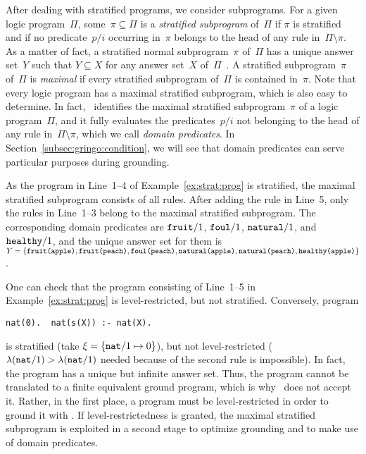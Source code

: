 After dealing with stratified programs, we consider subprograms.
For a given logic program~$\Pi$, some~$\pi\subseteq\Pi$ is a 
\emph{stratified subprogram} of~$\Pi$ if
$\pi$ is stratified and if
no predicate~$p/i$ occurring in~$\pi$ belongs to the head of any rule in~$\Pi\setminus\pi$.
As a matter of fact,
a stratified normal subprogram~$\pi$ of~$\Pi$ has a unique answer set~$Y$ such that
$Y\subseteq X$ for any answer set~$X$ of~$\Pi$~\cite{liftur94a}.
A stratified subprogram~$\pi$ of~$\Pi$ is \emph{maximal} if every stratified
subprogram of~$\Pi$ is contained in~$\pi$.
Note that every logic program has a maximal stratified subprogram,
which is also easy to determine.
In fact, \gringo\ identifies the maximal stratified subprogram~$\pi$
of a logic program~$\Pi$,
and it fully evaluates the predicates~$p/i$ not belonging to the head of any rule in~$\Pi\setminus\pi$,
which we call \emph{domain predicates}.
In Section~\ref{subsec:gringo:condition},
we will see that domain predicates can serve particular purposes during grounding.

\begin{example}\label{ex:strat:max}
As the program in Line~1--4 of Example~\ref{ex:strat:prog} is stratified,
the maximal stratified subprogram consists of all rules.
After adding the rule in Line~5,
only the rules in Line~1--3 belong to the maximal stratified subprogram.
The corresponding domain predicates are
$\texttt{fruit}/1$,
$\texttt{foul}/1$,
$\texttt{natural}/1$, and
$\texttt{healthy}/1$, 
and the unique answer set for them is
$
Y
=
\{
\code{\pred{fruit}(\const{apple})},\linebreak[1]
\code{\pred{fruit}(\const{peach})},\linebreak[1]
\code{\pred{foul}(\const{peach})},\linebreak[1]
\code{\pred{natural}(\const{apple})},\linebreak[1]
\code{\pred{natural}(\const{peach})},\linebreak[1]
\code{\pred{healthy}(\const{apple})}
\}
$.
\eexample
\end{example}

One can check that the program consisting of Line~1--5
in Example~\ref{ex:strat:prog} is level-restricted, but not stratified.
Conversely, program
\begin{lstlisting}[numbers=none]
nat(0).  nat(s(X)) :- nat(X).
\end{lstlisting}
is stratified (take $\xi=\{\texttt{nat}/1 \mapsto 0\}$),
but not level-restricted
($\lambda(\texttt{nat}/1)>\lambda(\texttt{nat}/1)$
 needed because of the second rule is impossible).
In fact, the program has a unique but infinite answer set.
Thus,
the program cannot be translated to a finite equivalent ground program,
which is why \gringo\ does not accept it.
Rather, in the first place, a program must be level-restricted in order
to ground it with \gringo.
If level-restrictedness is granted,
the maximal stratified subprogram is exploited in a second stage
to optimize grounding and to make use of domain predicates.

